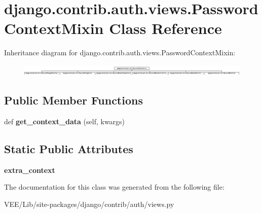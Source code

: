 \hypertarget{classdjango_1_1contrib_1_1auth_1_1views_1_1_password_context_mixin}{}\section{django.\+contrib.\+auth.\+views.\+Password\+Context\+Mixin Class Reference}
\label{classdjango_1_1contrib_1_1auth_1_1views_1_1_password_context_mixin}
Inheritance diagram for django.\+contrib.\+auth.\+views.\+Password\+Context\+Mixin\+:\begin{figure}[H]
\begin{center}
\leavevmode
\includegraphics[height=0.557214cm]{classdjango_1_1contrib_1_1auth_1_1views_1_1_password_context_mixin}
\end{center}
\end{figure}
\subsection*{Public Member Functions}
\begin{DoxyCompactItemize}
\item 
\mbox{\label{classdjango_1_1contrib_1_1auth_1_1views_1_1_password_context_mixin_a43d7bad682999a1f6a45d07c018b5503}} 
def {\bfseries get\+\_\+context\+\_\+data} (self, kwargs)
\end{DoxyCompactItemize}
\subsection*{Static Public Attributes}
\begin{DoxyCompactItemize}
\item 
\mbox{\label{classdjango_1_1contrib_1_1auth_1_1views_1_1_password_context_mixin_ac37788049dff97ebeaefd921ec20718c}} 
{\bfseries extra\+\_\+context}
\end{DoxyCompactItemize}


The documentation for this class was generated from the following file\+:\begin{DoxyCompactItemize}
\item 
V\+E\+E/\+Lib/site-\/packages/django/contrib/auth/views.\+py\end{DoxyCompactItemize}

